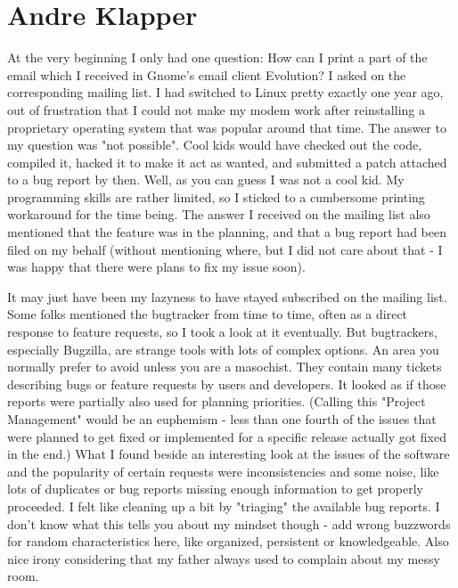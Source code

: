 \chapter{Andre Klapper}
At the very beginning I only had one question: How can I print a part of the email which I received in Gnome's email client Evolution? I asked on the corresponding mailing list.
I had switched to Linux pretty exactly one year ago, out of frustration that I could not make my modem work after reinstalling a proprietary operating system that was popular around that time.
The answer to my question was "not possible". Cool kids would have checked out the code, compiled it, hacked it to make it act as wanted, and submitted a patch attached to a bug report by then. Well, as you can guess I was not a cool kid. My programming skills are rather limited, so I sticked to a cumbersome printing workaround for the time being. The answer I received on the mailing list also mentioned that the feature was in the planning, and that a bug report had been filed on my behalf (without mentioning where, but I did not care about that - I was happy that there were plans to fix my issue soon).

It may just have been my lazyness to have stayed subscribed on the mailing list. Some folks mentioned the bugtracker from time to time, often as a direct response to feature requests, so I took a look at it eventually. But bugtrackers, especially Bugzilla, are strange tools with lots of complex options. An area you normally prefer to avoid unless you are a masochist. They contain many tickets describing bugs or feature requests by users and developers. It looked as if those reports were partially also used for planning priorities. (Calling this "Project Management" would be an euphemism - less than one fourth of the issues that were planned to get fixed or implemented for a specific release actually got fixed in the end.)
What I found beside an interesting look at the issues of the software and the popularity of certain requests were inconsistencies and some noise, like lots of duplicates or bug reports missing enough information to get properly proceeded. I felt like cleaning up a bit by "triaging" the available bug reports. I don't know what this tells you about my mindset though - add wrong buzzwords for random characteristics here, like organized, persistent or knowledgeable. Also nice irony considering that my father always used to complain about my messy room.


